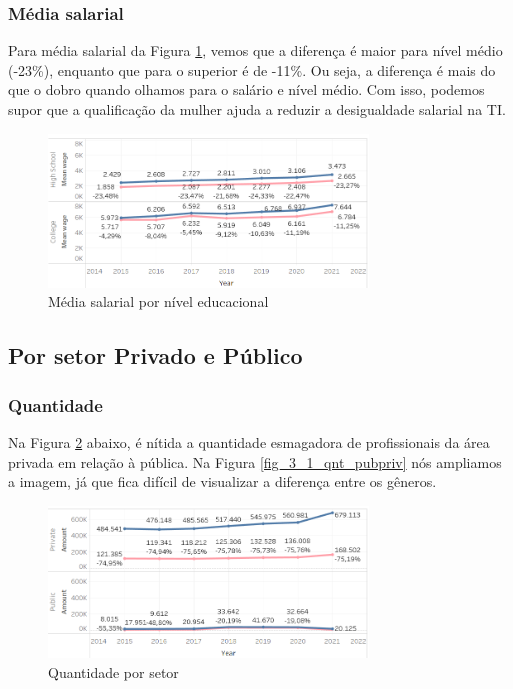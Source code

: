 \subsubsection{Média salarial}

Para média salarial da Figura \ref{fig_2_sal_educ}, vemos que a diferença é maior para nível médio (-23\%), enquanto que para o superior é de -11\%. Ou seja, a diferença é mais do que o dobro quando olhamos para o salário e nível médio. Com isso, podemos supor que a qualificação da mulher ajuda a reduzir a desigualdade salarial na TI.

\begin{figure}[htbp]
	\centerline{
		\includegraphics[width=85mm]{assets/2_sal_educ.PNG}
	}
	\caption{Média salarial por nível educacional}
	\label{fig_2_sal_educ}
\end{figure}

\subsection{Por setor Privado e Público}  \label{sub:privpub}

\subsubsection{Quantidade}

Na Figura \ref{fig_3_qnt_pubpriv} abaixo, é nítida a quantidade esmagadora de profissionais da área privada em relação à pública. Na Figura  \ref{fig_3_1_qnt_pubpriv} nós ampliamos a imagem, já que fica difícil de visualizar a diferença entre os gêneros.

\begin{figure}[htbp]
	\centerline{
		\includegraphics[width=85mm]{assets/3_qnt_pubpriv.PNG}
	}
	\caption{Quantidade por setor}
	\label{fig_3_qnt_pubpriv}
\end{figure}


